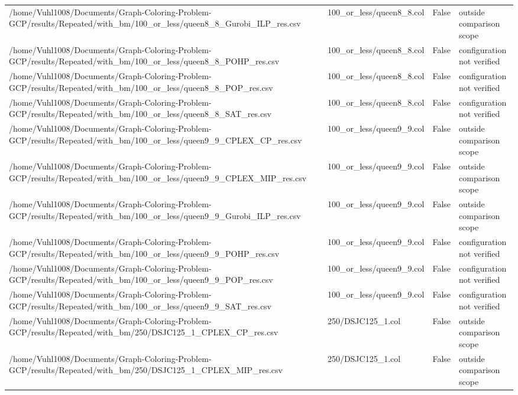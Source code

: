 \begin{table}[htbp]
\begin{tabular}{llll}
/home/Vuhl1008/Documents/Graph-Coloring-Problem-GCP/results/Repeated/with\_bm/100\_or\_less/queen8\_8\_Gurobi\_ILP\_res.csv & 100\_or\_less/queen8\_8.col & False & outside comparison scope \\
/home/Vuhl1008/Documents/Graph-Coloring-Problem-GCP/results/Repeated/with\_bm/100\_or\_less/queen8\_8\_POHP\_res.csv & 100\_or\_less/queen8\_8.col & False & configuration not verified \\
/home/Vuhl1008/Documents/Graph-Coloring-Problem-GCP/results/Repeated/with\_bm/100\_or\_less/queen8\_8\_POP\_res.csv & 100\_or\_less/queen8\_8.col & False & configuration not verified \\
/home/Vuhl1008/Documents/Graph-Coloring-Problem-GCP/results/Repeated/with\_bm/100\_or\_less/queen8\_8\_SAT\_res.csv & 100\_or\_less/queen8\_8.col & False & configuration not verified \\
/home/Vuhl1008/Documents/Graph-Coloring-Problem-GCP/results/Repeated/with\_bm/100\_or\_less/queen9\_9\_CPLEX\_CP\_res.csv & 100\_or\_less/queen9\_9.col & False & outside comparison scope \\
/home/Vuhl1008/Documents/Graph-Coloring-Problem-GCP/results/Repeated/with\_bm/100\_or\_less/queen9\_9\_CPLEX\_MIP\_res.csv & 100\_or\_less/queen9\_9.col & False & outside comparison scope \\
/home/Vuhl1008/Documents/Graph-Coloring-Problem-GCP/results/Repeated/with\_bm/100\_or\_less/queen9\_9\_Gurobi\_ILP\_res.csv & 100\_or\_less/queen9\_9.col & False & outside comparison scope \\
/home/Vuhl1008/Documents/Graph-Coloring-Problem-GCP/results/Repeated/with\_bm/100\_or\_less/queen9\_9\_POHP\_res.csv & 100\_or\_less/queen9\_9.col & False & configuration not verified \\
/home/Vuhl1008/Documents/Graph-Coloring-Problem-GCP/results/Repeated/with\_bm/100\_or\_less/queen9\_9\_POP\_res.csv & 100\_or\_less/queen9\_9.col & False & configuration not verified \\
/home/Vuhl1008/Documents/Graph-Coloring-Problem-GCP/results/Repeated/with\_bm/100\_or\_less/queen9\_9\_SAT\_res.csv & 100\_or\_less/queen9\_9.col & False & configuration not verified \\
/home/Vuhl1008/Documents/Graph-Coloring-Problem-GCP/results/Repeated/with\_bm/250/DSJC125\_1\_CPLEX\_CP\_res.csv & 250/DSJC125\_1.col & False & outside comparison scope \\
/home/Vuhl1008/Documents/Graph-Coloring-Problem-GCP/results/Repeated/with\_bm/250/DSJC125\_1\_CPLEX\_MIP\_res.csv & 250/DSJC125\_1.col & False & outside comparison scope \\

\end{tabular}
\end{table}
